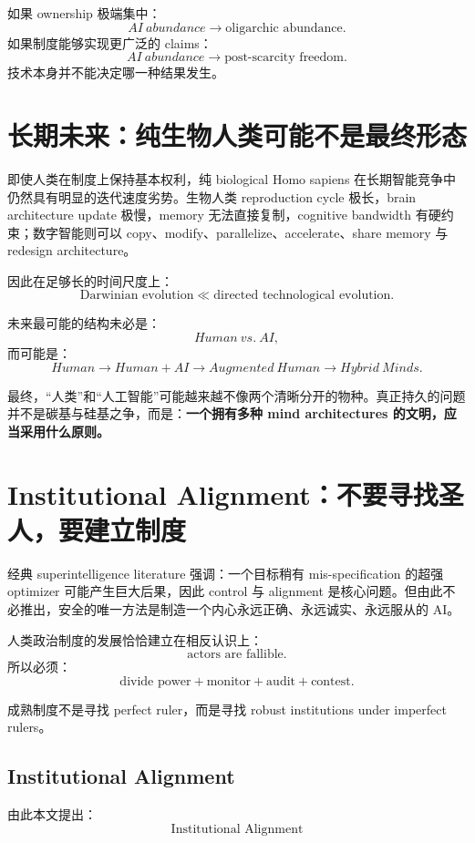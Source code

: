 \documentclass[11pt,letterpaper]{article}
\begin{document}
如果 ownership 极端集中：
\[
AI\ abundance\rightarrow\text{oligarchic abundance}.
\]
如果制度能够实现更广泛的 claims：
\[
AI\ abundance\rightarrow\text{post-scarcity freedom}.
\]
技术本身并不能决定哪一种结果发生。

\section{长期未来：纯生物人类可能不是最终形态}

即使人类在制度上保持基本权利，纯 biological Homo sapiens 在长期智能竞争中仍然具有明显的迭代速度劣势。生物人类 reproduction cycle 极长，brain architecture update 极慢，memory 无法直接复制，cognitive bandwidth 有硬约束；数字智能则可以 copy、modify、parallelize、accelerate、share memory 与 redesign architecture。

因此在足够长的时间尺度上：
\[
\text{Darwinian evolution}\ll\text{directed technological evolution}.
\]

未来最可能的结构未必是：
\[
Human\ vs.\ AI,
\]
而可能是：
\[
Human\rightarrow Human+AI\rightarrow Augmented\ Human\rightarrow Hybrid\ Minds.
\]

最终，“人类”和“人工智能”可能越来越不像两个清晰分开的物种。真正持久的问题并不是碳基与硅基之争，而是：\textbf{一个拥有多种 mind architectures 的文明，应当采用什么原则。}

\section{Institutional Alignment：不要寻找圣人，要建立制度}

经典 superintelligence literature 强调：一个目标稍有 mis-specification 的超强 optimizer 可能产生巨大后果，因此 control 与 alignment 是核心问题\cite{bostrom2014}。但由此不必推出，安全的唯一方法是制造一个内心永远正确、永远诚实、永远服从的 AI。

人类政治制度的发展恰恰建立在相反认识上：
\[
\text{actors are fallible}.
\]
所以必须：
\[
\text{divide power}+
\text{monitor}+
\text{audit}+
\text{contest}.
\]

成熟制度不是寻找 perfect ruler，而是寻找 robust institutions under imperfect rulers。

\subsection{Institutional Alignment}

由此本文提出：
\[
\boxed{\text{Institutional Alignment}}
\]
\end{document}

